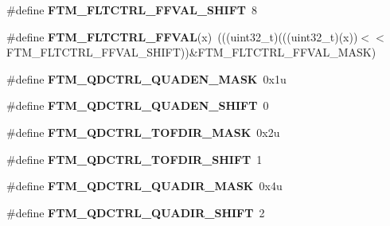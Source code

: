 \begin{DoxyCompactItemize}
\item 
\#define {\bfseries F\+T\+M\+\_\+\+F\+L\+T\+C\+T\+R\+L\+\_\+\+F\+F\+V\+A\+L\+\_\+\+S\+H\+I\+FT}~8\hypertarget{group__FTM__Register__Masks_gae69c26ba52bfb04edf52ec6574af426e}{}\label{group__FTM__Register__Masks_gae69c26ba52bfb04edf52ec6574af426e}

\item 
\#define {\bfseries F\+T\+M\+\_\+\+F\+L\+T\+C\+T\+R\+L\+\_\+\+F\+F\+V\+AL}(x)~(((uint32\+\_\+t)(((uint32\+\_\+t)(x))$<$$<$F\+T\+M\+\_\+\+F\+L\+T\+C\+T\+R\+L\+\_\+\+F\+F\+V\+A\+L\+\_\+\+S\+H\+I\+FT))\&F\+T\+M\+\_\+\+F\+L\+T\+C\+T\+R\+L\+\_\+\+F\+F\+V\+A\+L\+\_\+\+M\+A\+SK)\hypertarget{group__FTM__Register__Masks_ga2d74d328f8b0e1bf184935031c644ae7}{}\label{group__FTM__Register__Masks_ga2d74d328f8b0e1bf184935031c644ae7}

\item 
\#define {\bfseries F\+T\+M\+\_\+\+Q\+D\+C\+T\+R\+L\+\_\+\+Q\+U\+A\+D\+E\+N\+\_\+\+M\+A\+SK}~0x1u\hypertarget{group__FTM__Register__Masks_ga130e81d72e324d2e47e6613071606c4c}{}\label{group__FTM__Register__Masks_ga130e81d72e324d2e47e6613071606c4c}

\item 
\#define {\bfseries F\+T\+M\+\_\+\+Q\+D\+C\+T\+R\+L\+\_\+\+Q\+U\+A\+D\+E\+N\+\_\+\+S\+H\+I\+FT}~0\hypertarget{group__FTM__Register__Masks_gae39df93f832b0d790301964418e74938}{}\label{group__FTM__Register__Masks_gae39df93f832b0d790301964418e74938}

\item 
\#define {\bfseries F\+T\+M\+\_\+\+Q\+D\+C\+T\+R\+L\+\_\+\+T\+O\+F\+D\+I\+R\+\_\+\+M\+A\+SK}~0x2u\hypertarget{group__FTM__Register__Masks_ga0bab5d224dd3ac34bd2c827f96c60b14}{}\label{group__FTM__Register__Masks_ga0bab5d224dd3ac34bd2c827f96c60b14}

\item 
\#define {\bfseries F\+T\+M\+\_\+\+Q\+D\+C\+T\+R\+L\+\_\+\+T\+O\+F\+D\+I\+R\+\_\+\+S\+H\+I\+FT}~1\hypertarget{group__FTM__Register__Masks_ga6d666900b5d312877cc343dbc58969b0}{}\label{group__FTM__Register__Masks_ga6d666900b5d312877cc343dbc58969b0}

\item 
\#define {\bfseries F\+T\+M\+\_\+\+Q\+D\+C\+T\+R\+L\+\_\+\+Q\+U\+A\+D\+I\+R\+\_\+\+M\+A\+SK}~0x4u\hypertarget{group__FTM__Register__Masks_gac6c87f5278eaf7f6c4121ec5a3b316a5}{}\label{group__FTM__Register__Masks_gac6c87f5278eaf7f6c4121ec5a3b316a5}

\item 
\#define {\bfseries F\+T\+M\+\_\+\+Q\+D\+C\+T\+R\+L\+\_\+\+Q\+U\+A\+D\+I\+R\+\_\+\+S\+H\+I\+FT}~2\hypertarget{group__FTM__Register__Masks_ga31c6ba1b172d97e71ecd42ce6a8978ed}{}\label{group__FTM__Register__Masks_ga31c6ba1b172d97e71ecd42ce6a8978ed}


\end{DoxyCompactItemize}
